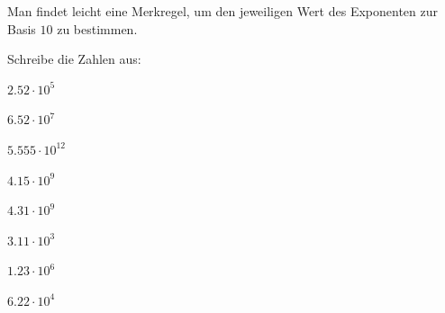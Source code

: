 \documentclass[%
11pt,%
twoside,%
titlepage,%
german,%
]{scrartcl}
\begin{document}
\begin{bem}
Man findet leicht eine Merkregel, um den jeweiligen Wert des Exponenten zur Basis $10$ zu bestimmen.
\end{bem}

\begin{ueb}[expand]
  Schreibe die Zahlen aus:
  \\[2.5ex]\hspace*{2.7ex}
  \begin{minipage}{0.4\textwidth}
    \begin{enumeratea}
      \item $2.52\cdot10^{5}$
      \item $6.52\cdot10^{7}$
      \item $5.555\cdot10^{12}$
      \item $4.15\cdot10^{9}$\\[1ex]
    \end{enumeratea}
  \end{minipage}
  \begin{minipage}{0.23\textwidth}
    \begin{enumeratea}\addtocounter{enumi}{4}
      \item $4.31\cdot10^{9}$
      \item $3.11\cdot10^{3}$
      \item $1.23\cdot10^{6}$
      \item $6.22\cdot10^{4}$\\[1ex]
    \end{enumeratea}
  \end{minipage}
\end{ueb}
\end{document}
